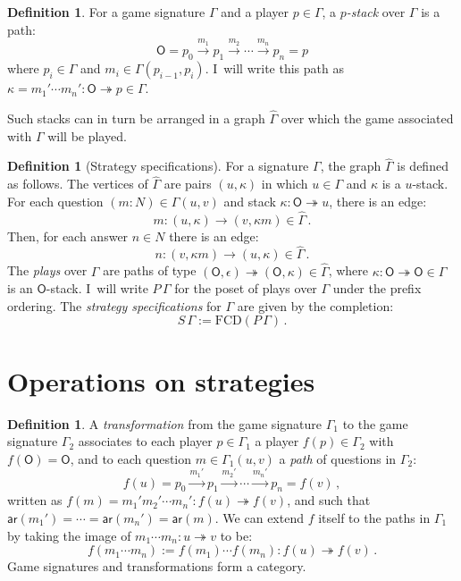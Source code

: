 \documentclass[11pt,oneside]{book}
\theoremstyle{definition}
\newtheorem{definition}[theorem]{Definition}
\newcommand{\kw}[1]{\ensuremath{ \mathsf{#1} }}
\begin{document}
\begin{definition}
For a game signature $\Gamma$ and a player $p \in \Gamma$,
a \emph{$p$-stack} over $\Gamma$ is a path:
\[
  \kw{O} = p_0 \xrightarrow{m_1} p_1 \xrightarrow{m_2} \cdots
             \xrightarrow{m_n} p_n = p
\]
where $p_i \in \Gamma$ and $m_i \in \Gamma(p_{i-1}, p_i)$.
I~will write this path as
$\kappa = m_1' \cdots m_n' : \kw{O} \twoheadrightarrow p
 \in \Gamma$.
\end{definition}

Such stacks can in turn be arranged in a graph $\hat{\Gamma}$
over which the game associated with $\Gamma$ will be played.

\begin{definition}[Strategy specifications] %
For a signature $\Gamma$,
the graph $\hat{\Gamma}$ is defined as follows.
The vertices of $\hat{\Gamma}$ are pairs $(u, \kappa)$
in which $u \in \Gamma$ and $\kappa$ is a $u$-stack.
For each question $(m \mathbin: N) \in \Gamma(u,v)$
and stack $\kappa : \kw{O} \twoheadrightarrow u$,
there is an edge:
\[
    m : (u, \kappa) \rightarrow (v, \kappa m) \in \hat{\Gamma} \,.
\]
Then, for each answer $n \in N$
there is an edge:
\[
    n : (v, \kappa m) \rightarrow (u, \kappa) \in \hat{\Gamma} \,.
\]
The \emph{plays} over $\Gamma$
are paths of type
$(\kw{O}, \epsilon) \twoheadrightarrow (\kw{O}, \kappa)
 \in \hat{\Gamma}$,
where $\kappa : \kw{O} \twoheadrightarrow \kw{O} \in \Gamma$
is an $\kw{O}$-stack.
I~will write
$P \, \Gamma$
for the poset of plays over $\Gamma$
under the prefix ordering.
The \emph{strategy specifications} for $\Gamma$
are given by the completion:
\[
    S \, \Gamma := \mathrm{FCD}(P \, \Gamma) \,.
\]
\end{definition}


\section{Operations on strategies} %

\begin{definition}
A \emph{transformation}
from the game signature $\Gamma_1$
to the game signature $\Gamma_2$
associates to each player $p \in \Gamma_1$ a player $f(p) \in \Gamma_2$
with $f(\kw{O}) = \kw{O}$,
and to each question $m \in \Gamma_1(u,v)$
a \emph{path} of questions in $\Gamma_2$:
\[
  f(u) = p_0 \xrightarrow{m_1'} p_1 \xrightarrow{m_2'} \cdots
             \xrightarrow{m_n'} p_n = f(v) \,,
\]
written as
$f(m) = m_1' m_2' \cdots m_n' : f(u) \twoheadrightarrow f(v)$, and
such that
$\kw{ar}(m_1') = \cdots = \kw{ar}(m_n') = \kw{ar}(m)$.
We can extend $f$ itself to the paths in $\Gamma_1$
by taking the image of $m_1 \cdots m_n : u \twoheadrightarrow v$
to be:
\[
  f(m_1 \cdots m_n) := f(m_1) \cdots f(m_n) :
    f(u) \twoheadrightarrow f(v) \,.
\]
Game signatures and transformations form a category.
\end{definition}
\end{document}
